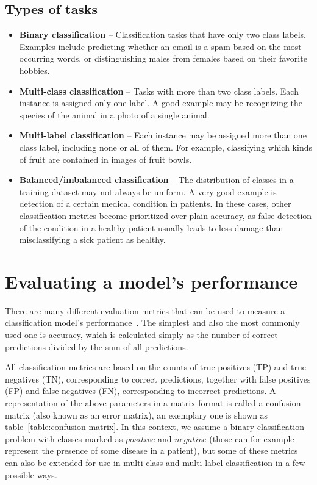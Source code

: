 \subsection*{Types of tasks}
\label{types-of-tasks}
\begin{itemize}
    \item \textbf{Binary classification} -- Classification tasks that have only two class labels. Examples include
    predicting whether an email is a spam based on the most occurring words, or distinguishing males
    from females based on their favorite hobbies.
    \item \textbf{Multi-class classification} -- Tasks with more than two class labels. Each instance
    is assigned only one label. A good example may be recognizing the species of the animal
    in a photo of a single animal.
    \item \textbf{Multi-label classification} -- Each instance may be assigned more than one class label,
    including none or all of them.
    For example, classifying which kinds of fruit are contained in images of fruit bowls.
    \item \textbf{Balanced/imbalanced classification} -- The distribution of classes in a training dataset
    may not always be uniform. A very good example is detection of a certain medical condition in patients.
    In these cases, other classification metrics become prioritized over plain accuracy,
    as false detection of the condition in a healthy patient usually leads to less damage
    than misclassifying a sick patient as healthy.
\end{itemize}




\section{Evaluating a model's performance}
\label{evaluating-a-models-performance}
There are many different evaluation metrics that can be used to measure a classification model's
performance~\cite{hossin2015review}.
The simplest and also the most commonly used one is accuracy, which is calculated simply
as the number of correct predictions divided by the sum of all predictions.

All classification metrics are based on the counts of true positives (TP) and true negatives (TN),
corresponding to correct predictions, together with false positives (FP) and false negatives (FN),
corresponding to incorrect predictions. A representation of the above parameters in a matrix format
is called a confusion matrix (also known as an error matrix),
an exemplary one is shown as table~\ref{table:confusion-matrix}.
In this context, we assume a binary classification
problem with classes marked as $positive$ and $negative$
(those can for example represent the presence of some disease in a patient), but some of these metrics can
also be extended for use in multi-class and multi-label classification in a few possible ways.

